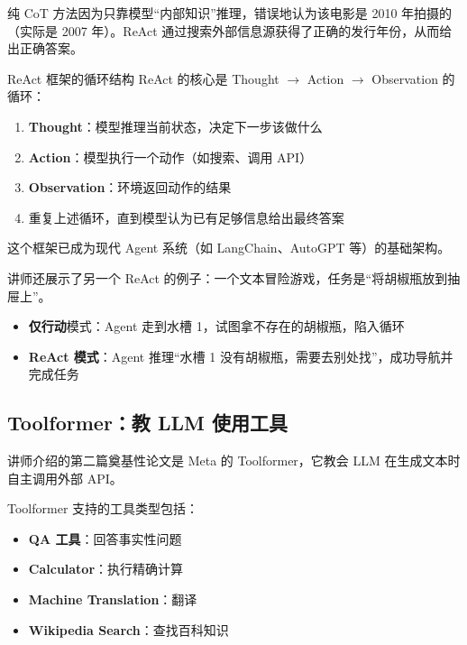 纯 CoT 方法因为只靠模型``内部知识''推理，错误地认为该电影是 2010 年拍摄的（实际是 2007 年）。ReAct 通过搜索外部信息源获得了正确的发行年份，从而给出正确答案。

\begin{importantbox}{ReAct 框架的循环结构}
ReAct 的核心是 Thought $\rightarrow$ Action $\rightarrow$ Observation 的循环：
\begin{enumerate}
    \item \textbf{Thought}：模型推理当前状态，决定下一步该做什么
    \item \textbf{Action}：模型执行一个动作（如搜索、调用 API）
    \item \textbf{Observation}：环境返回动作的结果
    \item 重复上述循环，直到模型认为已有足够信息给出最终答案
\end{enumerate}
这个框架已成为现代 Agent 系统（如 LangChain、AutoGPT 等）的基础架构。
\end{importantbox}

讲师还展示了另一个 ReAct 的例子：一个文本冒险游戏，任务是``将胡椒瓶放到抽屉上''。

\begin{itemize}
    \item \textbf{仅行动}模式：Agent 走到水槽 1，试图拿不存在的胡椒瓶，陷入循环
    \item \textbf{ReAct 模式}：Agent 推理``水槽 1 没有胡椒瓶，需要去别处找''，成功导航并完成任务
\end{itemize}

\subsection{Toolformer：教 LLM 使用工具}

讲师介绍的第二篇奠基性论文是 Meta 的 Toolformer，它教会 LLM 在生成文本时自主调用外部 API。

Toolformer 支持的工具类型包括：
\begin{itemize}
    \item \textbf{QA 工具}：回答事实性问题
    \item \textbf{Calculator}：执行精确计算
    \item \textbf{Machine Translation}：翻译
    \item \textbf{Wikipedia Search}：查找百科知识
\end{itemize}

